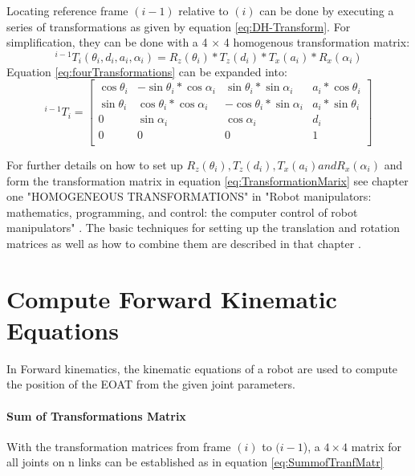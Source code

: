 Locating reference frame $(i-1)$ relative to $(i)$ can be done by executing a series of transformations as given by equation \ref{eq:DH-Transform}. 
For simplification, they can be done with a 4 × 4 homogenous transformation matrix:
\begin{equation} \label{eq:fourTransformations}
	^{i-1}T_i(\theta_i,d_i,a_i,\alpha_i)=R_z(\theta_i)*T_z(d_i)*T_x(a_i)*R_x(\alpha_i)
\end{equation}
Equation \ref{eq:fourTransformations} can be expanded into:
\begin{equation}\label{eq:TransformationMarix}
	^{i-1}T_i=
	\begin{bmatrix}
	\cos\theta_i & -\sin\theta_i*\cos\alpha_i & \sin\theta_i*\sin\alpha_i & a_i*\cos\theta_i \\
	\sin\theta_i & \cos\theta_i*\cos\alpha_i & -\cos\theta_i*\sin\alpha_i & a_i*\sin\theta_i \\ %
	0 & \sin\alpha_i & \cos\alpha_i & d_i \\
	0 & 0 & 0 & 1 \\
	\end{bmatrix}
\end{equation}

For further details on how to set up $R_z(\theta_i), T_z(d_i), T_x(a_i) and R_x(\alpha_i)$ and form the transformation matrix in equation \ref{eq:TransformationMarix} see chapter one "HOMOGENEOUS TRANSFORMATIONS" in "Robot manipulators: mathematics, programming, 
and control: the computer control of robot manipulators" \cite{Paul1981RobotM}. The basic techniques for setting up the translation and rotation matrices as well as how to combine them are described in that chapter .

\section{Compute Forward Kinematic Equations} \label{ForKinEq}
In Forward kinematics, the kinematic equations of a robot are used to compute the position of the \ac{EOAT} from the given joint parameters.

\paragraph{Sum of Transformations Matrix}
With the transformation matrices from frame $(i)$ to $(i-1$), a $4×4$ matrix for all joints on n links can be established as in equation \ref{eq:SummofTranfMatr}

